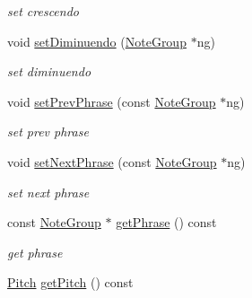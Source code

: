 \begin{DoxyCompactItemize}
\begin{DoxyCompactList}\small\item\em set crescendo \end{DoxyCompactList}\item 
\hypertarget{classsinsy_1_1NoteLabeler_aa65646ae98b670691fb9fedbb113b8ae}{void \hyperlink{classsinsy_1_1NoteLabeler_aa65646ae98b670691fb9fedbb113b8ae}{set\-Diminuendo} (\hyperlink{classsinsy_1_1NoteGroup}{\-Note\-Group} $\ast$ng)}\label{classsinsy_1_1NoteLabeler_aa65646ae98b670691fb9fedbb113b8ae}

\begin{DoxyCompactList}\small\item\em set diminuendo \end{DoxyCompactList}\item 
void \hyperlink{classsinsy_1_1NoteLabeler_a150254899347367acf8ca1120d72e022}{set\-Prev\-Phrase} (const \hyperlink{classsinsy_1_1NoteGroup}{\-Note\-Group} $\ast$ng)
\begin{DoxyCompactList}\small\item\em set prev phrase \end{DoxyCompactList}\item 
\hypertarget{classsinsy_1_1NoteLabeler_a725c30d75ab6605dc86431e76d37c4fa}{void \hyperlink{classsinsy_1_1NoteLabeler_a725c30d75ab6605dc86431e76d37c4fa}{set\-Next\-Phrase} (const \hyperlink{classsinsy_1_1NoteGroup}{\-Note\-Group} $\ast$ng)}\label{classsinsy_1_1NoteLabeler_a725c30d75ab6605dc86431e76d37c4fa}

\begin{DoxyCompactList}\small\item\em set next phrase \end{DoxyCompactList}\item 
\hypertarget{classsinsy_1_1NoteLabeler_a60b5e5ecab863576ae53b5eda1031b8a}{const \hyperlink{classsinsy_1_1NoteGroup}{\-Note\-Group} $\ast$ \hyperlink{classsinsy_1_1NoteLabeler_a60b5e5ecab863576ae53b5eda1031b8a}{get\-Phrase} () const }\label{classsinsy_1_1NoteLabeler_a60b5e5ecab863576ae53b5eda1031b8a}

\begin{DoxyCompactList}\small\item\em get phrase \end{DoxyCompactList}\item 
\hypertarget{classsinsy_1_1NoteLabeler_a6f822ab8d3a694b9a4a255b67f37045c}{\hyperlink{classsinsy_1_1Pitch}{\-Pitch} \hyperlink{classsinsy_1_1NoteLabeler_a6f822ab8d3a694b9a4a255b67f37045c}{get\-Pitch} () const }\label{classsinsy_1_1NoteLabeler_a6f822ab8d3a694b9a4a255b67f37045c}


\end{DoxyCompactItemize}

